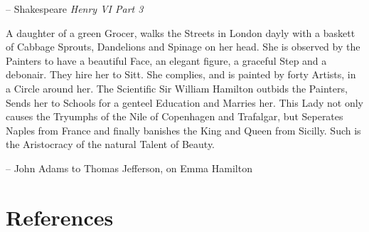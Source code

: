 \documentclass[
]{article}
\theoremstyle{definition}
\theoremstyle{definition}
\theoremstyle{definition}
\theoremstyle{definition}
\theoremstyle{remark}
\begin{document}
-- Shakespeare \emph{Henry VI Part 3}

A daughter of a green Grocer, walks the Streets in London dayly with a
baskett of Cabbage Sprouts, Dandelions and Spinage on her head. She is
observed by the Painters to have a beautiful Face, an elegant figure, a
graceful Step and a debonair. They hire her to Sitt. She complies, and
is painted by forty Artists, in a Circle around her. The Scientific Sir
William Hamilton outbids the Painters, Sends her to Schools for a
genteel Education and Marries her. This Lady not only causes the
Tryumphs of the Nile of Copenhagen and Trafalgar, but Seperates Naples
from France and finally banishes the King and Queen from Sicilly. Such
is the Aristocracy of the natural Talent of Beauty.

-- John Adams to Thomas Jefferson, on Emma Hamilton

\newpage

\hypertarget{references}{%
\section*{References}\label{references}}
\end{document}

